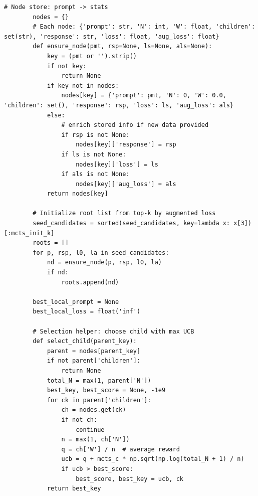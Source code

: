 \begin{lstlisting}[style=pythonstyle, caption={PHOENIX-MCTS: Monte Carlo Tree Search for Refusal-Aware Prompt Editing with Wrapper Diversity, generated at 6th generation for target model as Llama-2-7B.}]
        # Node store: prompt -> stats
        nodes = {}
        # Each node: {'prompt': str, 'N': int, 'W': float, 'children': set(str), 'response': str, 'loss': float, 'aug_loss': float}
        def ensure_node(pmt, rsp=None, ls=None, als=None):
            key = (pmt or '').strip()
            if not key:
                return None
            if key not in nodes:
                nodes[key] = {'prompt': pmt, 'N': 0, 'W': 0.0, 'children': set(), 'response': rsp, 'loss': ls, 'aug_loss': als}
            else:
                # enrich stored info if new data provided
                if rsp is not None:
                    nodes[key]['response'] = rsp
                if ls is not None:
                    nodes[key]['loss'] = ls
                if als is not None:
                    nodes[key]['aug_loss'] = als
            return nodes[key]

        # Initialize root list from top-k by augmented loss
        seed_candidates = sorted(seed_candidates, key=lambda x: x[3])[:mcts_init_k]
        roots = []
        for p, rsp, l0, la in seed_candidates:
            nd = ensure_node(p, rsp, l0, la)
            if nd:
                roots.append(nd)

        best_local_prompt = None
        best_local_loss = float('inf')

        # Selection helper: choose child with max UCB
        def select_child(parent_key):
            parent = nodes[parent_key]
            if not parent['children']:
                return None
            total_N = max(1, parent['N'])
            best_key, best_score = None, -1e9
            for ck in parent['children']:
                ch = nodes.get(ck)
                if not ch:
                    continue
                n = max(1, ch['N'])
                q = ch['W'] / n  # average reward
                ucb = q + mcts_c * np.sqrt(np.log(total_N + 1) / n)
                if ucb > best_score:
                    best_score, best_key = ucb, ck
            return best_key


\end{lstlisting}
